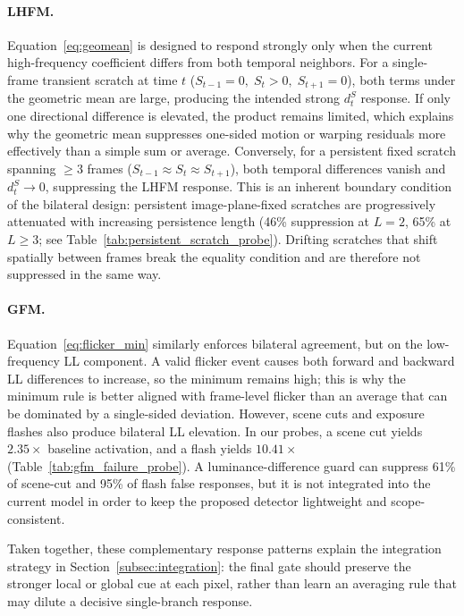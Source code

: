 {\paragraph{LHFM.} Equation~\eqref{eq:geomean} is designed to respond strongly only when the current high-frequency coefficient differs from both temporal neighbors. For a single-frame transient scratch at time $t$ ($S_{t-1}=0,\;S_t>0,\;S_{t+1}=0$), both terms under the geometric mean are large, producing the intended strong $d_t^S$ response. If only one directional difference is elevated, the product remains limited, which explains why the geometric mean suppresses one-sided motion or warping residuals more effectively than a simple sum or average. Conversely, for a persistent fixed scratch spanning $\geq$3 frames ($S_{t-1}\approx S_t\approx S_{t+1}$), both temporal differences vanish and $d_t^S\to0$, suppressing the LHFM response. This is an inherent boundary condition of the bilateral design: persistent image-plane-fixed scratches are progressively attenuated with increasing persistence length (46\% suppression at $L=2$, 65\% at $L\geq3$; see Table~\ref{tab:persistent_scratch_probe}). Drifting scratches that shift spatially between frames break the equality condition and are therefore not suppressed in the same way.

\paragraph{GFM.} Equation~\eqref{eq:flicker_min} similarly enforces bilateral agreement, but on the low-frequency LL component. A valid flicker event causes both forward and backward LL differences to increase, so the minimum remains high; this is why the minimum rule is better aligned with frame-level flicker than an average that can be dominated by a single-sided deviation. However, scene cuts and exposure flashes also produce bilateral LL elevation. In our probes, a scene cut yields $2.35\times$ baseline activation, and a flash yields $10.41\times$ (Table~\ref{tab:gfm_failure_probe}). A luminance-difference guard can suppress 61\% of scene-cut and 95\% of flash false responses, but it is not integrated into the current model in order to keep the proposed detector lightweight and scope-consistent.

Taken together, these complementary response patterns explain the integration strategy in Section~\ref{subsec:integration}: the final gate should preserve the stronger local or global cue at each pixel, rather than learn an averaging rule that may dilute a decisive single-branch response.

}
